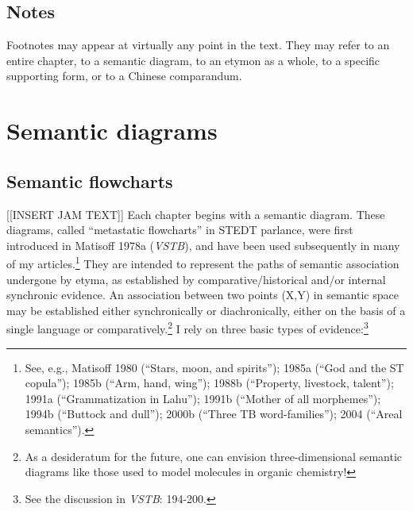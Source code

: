 \subsection{Notes}

Footnotes may appear at virtually any point in the text. They may refer to an entire chapter, to a semantic diagram, to an etymon as a whole, to a specific supporting form, or to a Chinese comparandum.

\section{Semantic diagrams}
\subsection{Semantic flowcharts}
[[INSERT JAM TEXT]]
Each chapter begins with a semantic diagram.  These diagrams, called
“metastatic flowcharts” in STEDT parlance, were first introduced in Matisoff 1978a (\textit{VSTB}),
and have been used subsequently in many of my articles.\footnote{See, e.g.,
Matisoff 1980 (“Stars, moon, and spirits”); 1985a (“God and the ST copula”);
1985b (“Arm, hand, wing”); 1988b (“Property, livestock, talent”); 1991a
(“Grammatization in Lahu”); 1991b (“Mother of all morphemes”); 1994b (“Buttock
and dull”); 2000b (“Three TB word-families”); 2004 (“Areal semantics”).}
They
are intended to represent the paths of semantic association undergone by etyma,
as established by comparative/historical and/or internal synchronic evidence. An
association between two points (X,Y) in semantic space may be established either
synchronically or diachronically, either on the basis of a single language or
comparatively.\footnote{As a desideratum for the future, one can envision
three-dimensional semantic diagrams like those used to model molecules in
organic chemistry!}  I rely on three basic types of evidence:\footnote{See the
discussion in \textit{VSTB}: 194-200.}
